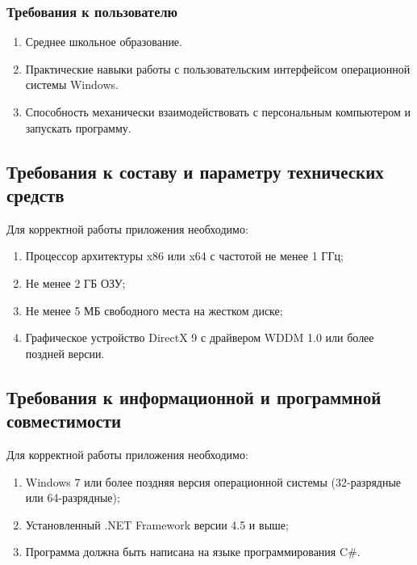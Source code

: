 \documentclass[a4paper,12pt,reqno]{article}
\begin{document}
  \subsubsection{Требования к пользователю}
  \begin{enumerate}
    \item Среднее школьное образование.
    \item Практические навыки работы с пользовательским интерфейсом операционной системы Windows.
    \item Способность механически взаимодействовать с персональным компьютером и запускать программу.
  \end{enumerate}


  \subsection{Требования к составу и параметру технических средств}
  Для корректной работы приложения необходимо:
  \begin{enumerate}
    \item Процессор архитектуры x86 или x64 с частотой не менее 1 ГГц;
    \item Не менее 2 ГБ ОЗУ;
    \item Не менее 5 МБ свободного места на жестком диске;
    \item Графическое устройство DirectX 9 с драйвером WDDM 1.0 или более поздней версии.
  \end{enumerate}

  \subsection{Требования к информационной и программной совместимости}
  Для корректной работы приложения необходимо:
  \begin{enumerate}
    \item Windows 7 или более поздняя версия операционной системы (32-разрядные или 64-разрядные);
    \item Установленный .NET Framework версии 4.5 и выше;
    \item Программа должна быть написана на языке программирования C\#.
  \end{enumerate}

\end{document}
